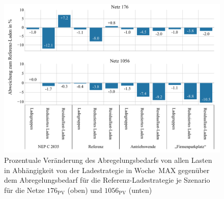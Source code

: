 \begin{figure}[H]
    \centering
    \includegraphics[width=\textwidth]{Bilder/176_1056_cur_load_grid_week_B}
    \caption[Prozentuale Veränderung des Abregelungsbedarfs von allen Lasten in Abhängigkeit von der Ladestrategie in Woche~MAX gegenüber dem Abregelungsbedarf für die Referenz-Ladestrategie je Szenario für die Netze \num{176} und \num{1056}]{Prozentuale Veränderung des Abregelungsbedarfs von allen Lasten in Abhängigkeit von der Ladestrategie in Woche~MAX gegenüber dem Abregelungsbedarf für die Referenz-Ladestrategie je Szenario für die Netze \(176_{\text{PV}}\) (oben) und \(1056_{\text{PV}}\) (unten)}\label{fig:176_1056_cur_load_grid_week_B}
\end{figure}